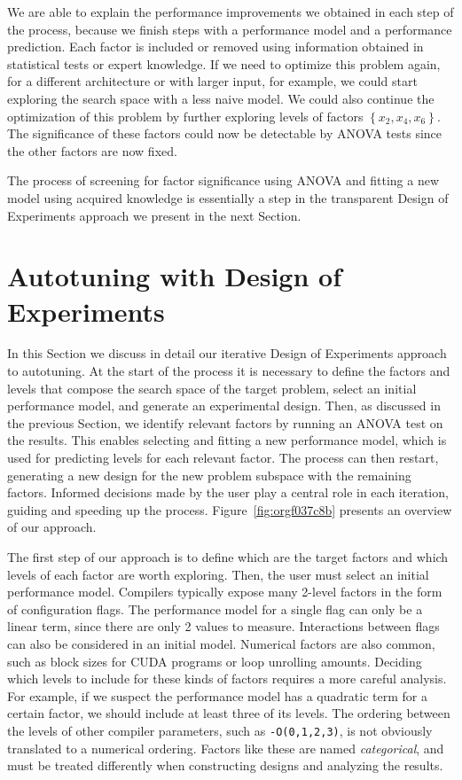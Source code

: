 \documentclass[conference]{IEEEtran}
\begin{document}
We are able to explain the performance improvements we obtained in each step of
the process, because we finish steps with a performance model and a performance
prediction. Each factor is included or removed using information obtained in
statistical tests or expert knowledge. If we need to optimize this problem
again, for a different architecture or with larger input, for example, we could
start exploring the search space with a less naive model. We could also continue
the optimization of this problem by further exploring levels of factors
\(\left\{x_2,x_4,x_6\right\}\). The significance of these factors could now be
detectable by ANOVA tests since the other factors are now fixed.

The process of screening for factor significance using ANOVA and fitting a
new model using acquired knowledge is essentially a step in the transparent
Design of Experiments approach we present in the next Section.
\section{Autotuning with Design of Experiments}
\label{sec:org13fb9b6}
In this Section we discuss in detail our iterative Design of Experiments
approach to autotuning. At the start of the process it is necessary to define
the factors and levels that compose the search space of the target problem,
select an initial performance model, and generate an experimental design. Then,
as discussed in the previous Section, we identify relevant factors by running an
ANOVA test on the results. This enables selecting and fitting a new performance
model, which is used for predicting levels for each relevant factor. The process
can then restart, generating a new design for the new problem subspace with the
remaining factors. Informed decisions made by the user play a central role in
each iteration, guiding and speeding up the process.
Figure~\ref{fig:orgf037c8b} presents an overview of our approach.

The first step of our approach is to define which are the target factors and
which levels of each factor are worth exploring. Then, the user must select an
initial performance model. Compilers typically expose many 2-level factors in
the form of configuration flags. The performance model for a single flag can
only be a linear term, since there are only 2 values to measure. Interactions
between flags can also be considered in an initial model. Numerical factors are
also common, such as block sizes for CUDA programs or loop unrolling amounts.
Deciding which levels to include for these kinds of factors requires a more
careful analysis. For example, if we suspect the performance model has a
quadratic term for a certain factor, we should include at least three of its
levels. The ordering between the levels of other compiler parameters, such as
\texttt{-O(0,1,2,3)}, is not obviously translated to a numerical ordering.
Factors like these are named \emph{categorical}, and must be treated differently when
constructing designs and analyzing the results.
\end{document}
